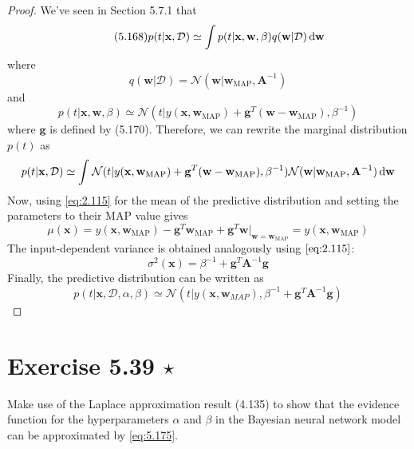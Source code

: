 \begin{proof}
    We've seen in Section 5.7.1 that 
    \begin{equation}\label{eq:5.168}\tag{5.168}
        p(t | \mathbf{x}, \mathcal{D}) 
        \simeq
        \int p(t | \mathbf{x}, \mathbf{w}, \beta)q(\mathbf{w} | \mathcal{D}) \mathop{}\!\mathrm{d} \mathbf{w}
    \end{equation}
    where 
    \begin{equation}\label{eq:5.167}\tag{5.167}
        q(\mathbf{w} | \mathcal{D}) 
        = \mathcal{N}(\mathbf{w} | \mathbf{w}_{\text{MAP}}, \mathbf{A}^{-1})
    \end{equation}
    and 
    \begin{equation}\label{eq:5.171}\tag{5.171}
        p(t | \mathbf{x}, \mathbf{w}, \beta)
        \simeq \mathcal{N}(t | y(\mathbf{x}, \mathbf{w}_\text{MAP}) 
        + \mathbf{g}^T(\mathbf{w} - \mathbf{w}_\text{MAP}), \beta^{-1})
    \end{equation}
    where $\mathbf{g}$ is defined by (5.170). Therefore, we can rewrite the marginal
    distribution $p(t)$ as 
    \[
        p(t | \mathbf{x}, \mathcal{D})
        \simeq \int_{}^{} 
        \mathcal{N}(t | y(\mathbf{x}, \mathbf{w}_\text{MAP}) 
        + \mathbf{g}^T(\mathbf{w} - \mathbf{w}_\text{MAP}), \beta^{-1})
        \mathcal{N}(\mathbf{w} | \mathbf{w}_{\text{MAP}}, \mathbf{A}^{-1})
        \mathop{}\!\mathrm{d} \mathbf{w}
    \] 
    Now, using \eqref{eq:2.115} for the mean of the predictive distribution
    and setting the parameters to their MAP value gives
    \[
        \mu(\mathbf{x}) 
        = y(\mathbf{x}, \mathbf{w}_\text{MAP}) -\mathbf{g}^T \mathbf{w}_\text{MAP}
        + \mathbf{g}^T\mathbf{w}|_{\mathbf{w} = \mathbf{w}_\text{MAP}}
        = y(\mathbf{x}, \mathbf{w}_\text{MAP})
    \] 
    The input-dependent variance is obtained analogously using $\eqref{eq:2.115}$:
    \begin{equation}\label{eq:5.173}\tag{5.173}
        \sigma^2(\mathbf{x}) = \beta^{-1} + \mathbf{g}^T\mathbf{A}^{-1}\mathbf{g} 
    \end{equation}
    Finally, the predictive distribution can be written as
    \begin{equation}\label{eq:5.172}\tag{5.172}
        p(t | \mathbf{x}, \mathcal{D}, \alpha, \beta)
        \simeq \mathcal{N}(t | y(\mathbf{x}, \mathbf{w}_{MAP}), 
        \beta^{-1} + \mathbf{g}^T\mathbf{A}^{-1}\mathbf{g})
    \end{equation}
\end{proof}

\section*{Exercise 5.39 $\star$}
Make use of the Laplace approximation result (4.135) to show that the
evidence function for the hyperparameters $\alpha$ and $\beta$ in the Bayesian
neural network model can be approximated by \eqref{eq:5.175}.


